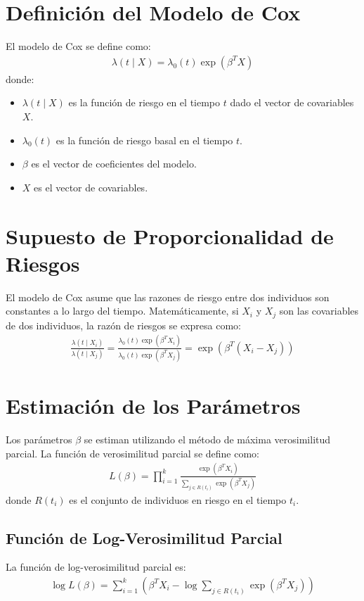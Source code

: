 \documentclass[a4paper]{report} %
\begin{document}
\section{Definici\'on del Modelo de Cox}
El modelo de Cox se define como:
\begin{eqnarray*}
\lambda(t \mid X) = \lambda_0(t) \exp(\beta^T X)
\end{eqnarray*}
donde:
\begin{itemize}
    \item $\lambda(t \mid X)$ es la funci\'on de riesgo en el tiempo $t$ dado el vector de covariables $X$.
    \item $\lambda_0(t)$ es la funci\'on de riesgo basal en el tiempo $t$.
    \item $\beta$ es el vector de coeficientes del modelo.
    \item $X$ es el vector de covariables.
\end{itemize}

\section{Supuesto de Proporcionalidad de Riesgos}
El modelo de Cox asume que las razones de riesgo entre dos individuos son constantes a lo largo del tiempo. Matem\'aticamente, si $X_i$ y $X_j$ son las covariables de dos individuos, la raz\'on de riesgos se expresa como:
\begin{eqnarray*}
\frac{\lambda(t \mid X_i)}{\lambda(t \mid X_j)} = \frac{\lambda_0(t) \exp(\beta^T X_i)}{\lambda_0(t) \exp(\beta^T X_j)} = \exp(\beta^T (X_i - X_j))
\end{eqnarray*}

\section{Estimaci\'on de los Par\'ametros}
Los par\'ametros $\beta$ se estiman utilizando el m\'etodo de m\'axima verosimilitud parcial. La funci\'on de verosimilitud parcial se define como:
\begin{eqnarray*}
L(\beta) = \prod_{i=1}^k \frac{\exp(\beta^T X_i)}{\sum_{j \in R(t_i)} \exp(\beta^T X_j)}
\end{eqnarray*}
donde $R(t_i)$ es el conjunto de individuos en riesgo en el tiempo $t_i$.

\subsection{Funci\'on de Log-Verosimilitud Parcial}
La funci\'on de log-verosimilitud parcial es:
\begin{eqnarray*}
\log L(\beta) = \sum_{i=1}^k \left(\beta^T X_i - \log \sum_{j \in R(t_i)} \exp(\beta^T X_j)\right)
\end{eqnarray*}
\end{document}
